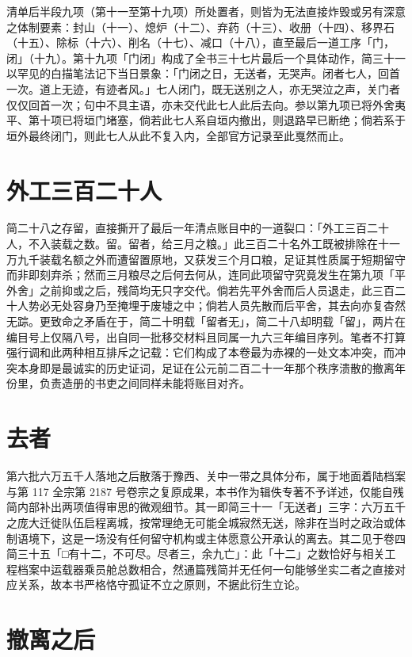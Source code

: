 清单后半段九项（第十一至第十九项）所处置者，则皆为无法直接炸毁或另有深意之体制要素：封山（十一）、熄炉（十二）、弃药（十三）、收册（十四）、移界石（十五）、除标（十六）、削名（十七）、减口（十八），直至最后一道工序「门，闭」（十九）。第十九项「门闭」构成了全书三十七片最后一个具体动作，简三十一以罕见的白描笔法记下当日景象：「门闭之日，无送者，无哭声。闭者七人，回首一次。道上无迹，有迹者风。」七人闭门，既无送别之人，亦无哭泣之声，关门者仅仅回首一次；句中不具主语，亦未交代此七人此后去向。参以第九项已将外舍夷平、第十项已将垣门堵塞，倘若此七人系自垣内撤出，则退路早已断绝；倘若系于垣外最终闭门，则此七人从此不复入内，全部官方记录至此戛然而止。

\section{外工三百二十人}

简二十八之存留，直接撕开了最后一年清点账目中的一道裂口：「外工三百二十人，不入装载之数。留。留者，给三月之粮。」此三百二十名外工既被排除在十一万九千装载名额之外而遭留置原地，又获发三个月口粮，足证其性质属于短期留守而非即刻弃杀；然而三月粮尽之后何去何从，连同此项留守究竟发生在第九项「平外舍」之前抑或之后，残简均无只字交代。倘若先平外舍而后人员退走，此三百二十人势必无处容身乃至掩埋于废墟之中；倘若人员先散而后平舍，其去向亦复杳然无踪。更致命之矛盾在于，简二十明载「留者无」，简二十八却明载「留」，两片在编目号上仅隔八号，出自同一批移交材料且同属一九六三年编目序列。笔者不打算强行调和此两种相互排斥之记载：它们构成了本卷最为赤裸的一处文本冲突，而冲突本身即是最诚实的历史证词，足证在公元前二百二十一年那个秩序溃散的撤离年份里，负责造册的书吏之间同样未能将账目对齐。

\section{去者}

第六批六万五千人落地之后散落于豫西、关中一带之具体分布，属于地面着陆档案与第 117 全宗第 2187 号卷宗之复原成果，本书作为辑佚专著不予详述，仅能自残简内部补出两项值得审思的微观细节。其一即简三十一「无送者」三字：六万五千之庞大迁徙队伍启程离城，按常理绝无可能全城寂然无送，除非在当时之政治或体制语境下，这是一场没有任何留守机构或主体愿意公开承认的离去。其二见于卷四简三十五「□有十二，不可尽。尽者三，余九亡」：此「十二」之数恰好与相关工程档案中运载器乘员舱总数相合，然通篇残简并无任何一句能够坐实二者之直接对应关系，故本书严格恪守孤证不立之原则，不据此衍生立论。

\section{撤离之后}


